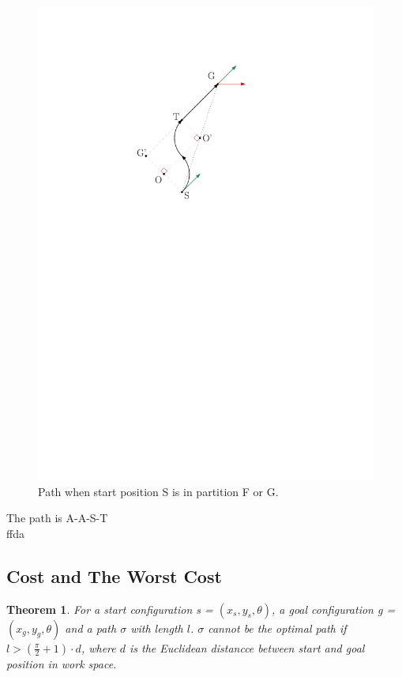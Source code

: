 \documentclass[12pt]{article}
\newtheorem{theorem}{Theorem}[section]
\begin{document}
  \begin{figure}
  \centering
  \includegraphics[scale=1]{Diff_Drive_Gene_Case_1}
  \caption{Path when start position S is in partition F or G.}
  \end{figure}
  
  The path is A-A-S-T\\
  ffda
  \subsection{Cost and The Worst Cost}

  \begin{theorem}
  	For a start configuration s = $(x_{s},y_{s},\theta)$, a goal configuration g = $(x_{g},y_{g},\theta)$ and a path $\sigma$ with length $l$. $\sigma$ cannot be the optimal path if $l > (\frac{\pi}{2} + 1) \cdot d$, where $d$ is the Euclidean distancce between start and goal position in work space.
  \end{theorem}
\end{document}
